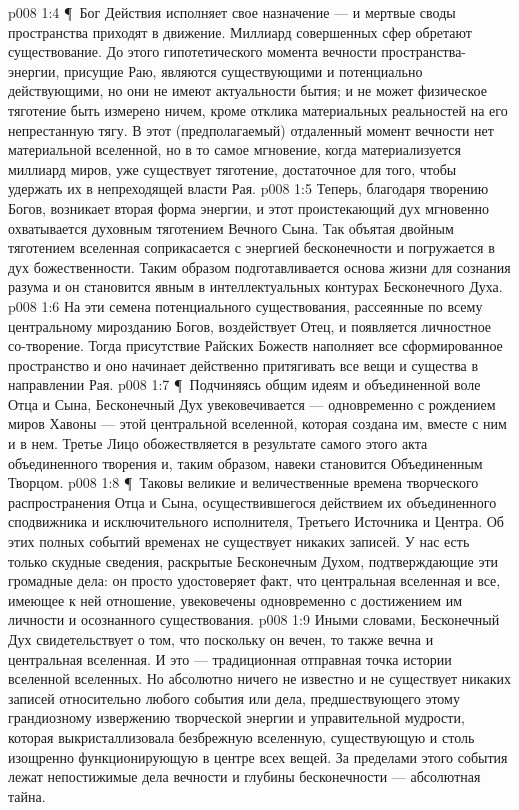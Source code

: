 \vs p008 1:4 \P\ Бог Действия исполняет свое назначение --- и мертвые своды пространства приходят в движение. Миллиард совершенных сфер обретают существование. До этого гипотетического момента вечности пространства\hyp{}энергии, присущие Раю, являются существующими и потенциально действующими, но они не имеют актуальности бытия; и не может физическое тяготение быть измерено ничем, кроме отклика материальных реальностей на его непрестанную тягу. В этот (предполагаемый) отдаленный момент вечности нет материальной вселенной, но в то самое мгновение, когда материализуется миллиард миров, уже существует тяготение, достаточное для того, чтобы удержать их в непреходящей власти Рая.
\vs p008 1:5 Теперь, благодаря творению Богов, возникает вторая форма энергии, и этот проистекающий дух мгновенно охватывается духовным тяготением Вечного Сына. Так объятая двойным тяготением вселенная соприкасается с энергией бесконечности и погружается в дух божественности. Таким образом подготавливается основа жизни для сознания разума и он становится явным в интеллектуальных контурах Бесконечного Духа.
\vs p008 1:6 На эти семена потенциального существования, рассеянные по всему центральному мирозданию Богов, воздействует Отец, и появляется личностное со\hyp{}творение. Тогда присутствие Райских Божеств наполняет все сформированное пространство и оно начинает действенно притягивать все вещи и существа в направлении Рая.
\vs p008 1:7 \P\ Подчиняясь общим идеям и объединенной воле Отца и Сына, Бесконечный Дух увековечивается --- одновременно с рождением миров Хавоны --- этой центральной вселенной, которая создана им, вместе с ним и в нем. Третье Лицо обожествляется в результате самого этого акта объединенного творения и, таким образом, навеки становится Объединенным Творцом.
\vs p008 1:8 \P\ Таковы великие и величественные времена творческого распространения Отца и Сына, осуществившегося действием их объединенного сподвижника и исключительного исполнителя, Третьего Источника и Центра. Об этих полных событий временах не существует никаких записей. У нас есть только скудные сведения, раскрытые Бесконечным Духом, подтверждающие эти громадные дела: он просто удостоверяет факт, что центральная вселенная и все, имеющее к ней отношение, увековечены одновременно с достижением им личности и осознанного существования.
\vs p008 1:9 Иными словами, Бесконечный Дух свидетельствует о том, что поскольку он вечен, то также вечна и центральная вселенная. И это --- традиционная отправная точка истории вселенной вселенных. Но абсолютно ничего не известно и не существует никаких записей относительно любого события или дела, предшествующего этому грандиозному извержению творческой энергии и управительной мудрости, которая выкристаллизовала безбрежную вселенную, существующую и столь изощренно функционирующую в центре всех вещей. За пределами этого события лежат непостижимые дела вечности и глубины бесконечности --- абсолютная тайна.
